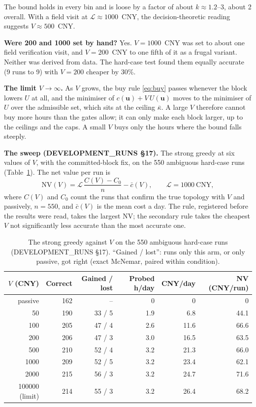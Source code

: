 \documentclass[11pt]{article}
\theoremstyle{definition}
\newcommand{\bu}{\bm{u}}
\begin{document}
{The bound holds in every bin and is loose by a factor of about $k\approx1.2$--$3$, about 2 overall. With a field visit at $\mathcal L\approx1000$~CNY, the decision-theoretic reading suggests $V\approx500$~CNY.

\textbf{Were 200 and 1000 set by hand?} Yes. $V=1000$~CNY was set to about one field verification visit, and $V=200$~CNY to one fifth of it as a frugal variant. Neither was derived from data. The hard-case test found them equally accurate (9 runs to 9) with $V=200$ cheaper by 30\%.

\textbf{The limit $V\to\infty$.} As $V$ grows, the buy rule \eqref{eq:buy} passes whenever the block lowers $U$ at all, and the minimiser of $c(\bu)+V\,U(\bu)$ moves to the minimiser of $U$ over the admissible set, which sits at the ceiling $\bar\kappa$. A large $V$ therefore cannot buy more hours than the gates allow; it can only make each block larger, up to the ceilings and the caps. A small $V$ buys only the hours where the bound falls steeply.

\textbf{The sweep (DEVELOPMENT\_RUNS \S17).} The strong greedy at six values of $V$, with the committed-block fix, on the 550 ambiguous hard-case runs (Table~\ref{tab:vsweep}). The net value per run is
\begin{equation}
  \mathrm{NV}(V)=\mathcal L\,\frac{C(V)-C_0}{n}-\bar c(V),\qquad \mathcal L=1000~\text{CNY},
\end{equation}
where $C(V)$ and $C_0$ count the runs that confirm the true topology with $V$ and passively, $n=550$, and $\bar c(V)$ is the mean cost a day. The rule, registered before the results were read, takes the largest $\mathrm{NV}$; the secondary rule takes the cheapest $V$ not significantly less accurate than the most accurate one.

\begin{table}[h]
\centering
\caption{The strong greedy against $V$ on the 550 ambiguous hard-case runs (DEVELOPMENT\_RUNS \S17). ``Gained / lost'': runs only this arm, or only passive, got right (exact McNemar, paired within condition).}\label{tab:vsweep}
\begin{tabular}{@{}rrrrrr@{}}
\toprule
$V$ (CNY) & Correct & Gained / lost & Probed h/day & CNY/day & NV (CNY/run)\\
\midrule
passive & 162 & -- & 0 & 0 & 0\\
50 & 190 & 33 / 5 & 1.9 & 6.8 & 44.1\\
100 & 205 & 47 / 4 & 2.6 & 11.6 & 66.6\\
200 & 206 & 47 / 3 & 3.0 & 16.5 & 63.5\\
500 & 210 & 52 / 4 & 3.2 & 21.3 & 66.0\\
1000 & 209 & 52 / 5 & 3.2 & 23.4 & 62.1\\
2000 & 215 & 56 / 3 & 3.2 & 24.7 & 71.6\\
100000 (limit) & 214 & 55 / 3 & 3.2 & 26.4 & 68.2\\
\bottomrule
\end{tabular}
\end{table}

}
\end{document}
